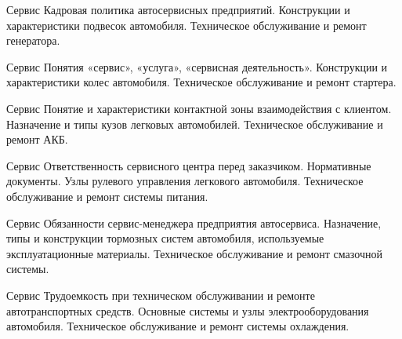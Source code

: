 \documentclass[
	11pt,
	a4paper,
	]
	{article}
\begin{document}
\begin{minipage}[t][\miniH]{\miniL}\centering
	 {Сервис}
		{
			Кадровая политика автосервисных предприятий.
		}{
			Конструкции и характеристики подвесок автомобиля.
		}{
			Техническое обслуживание и ремонт генератора.
		}
	\lowGE
\end{minipage}

\vfill



\begin{minipage}[t][\miniH]{\miniL}\centering
	 {Сервис}
		{
			Понятия «сервис», «услуга», «сервисная деятельность».
		}{
			Конструкции и характеристики колес автомобиля.
		}{
			Техническое обслуживание и ремонт стартера.
		}
	\lowGE
\end{minipage}





\begin{minipage}[t][\miniH]{\miniL}\centering
	 {Сервис}
		{
			Понятие и характеристики контактной зоны взаимодействия с клиентом.
		}{
			Назначение и типы кузов легковых автомобилей.
		}{
			Техническое обслуживание и ремонт АКБ.
		}
	\lowGE
\end{minipage}

\vfill



\begin{minipage}[t][\miniH]{\miniL}\centering
	 {Сервис}
		{
			Ответственность сервисного центра перед заказчиком. Нормативные документы.
		}{
			Узлы рулевого управления легкового автомобиля.
		}{
			Техническое обслуживание и ремонт системы питания.
		}
	\lowGE
\end{minipage}

\vfill



\begin{minipage}[t][\miniH]{\miniL}\centering
	 {Сервис}
		{
			Обязанности сервис-менеджера предприятия автосервиса.
		}{
			Назначение, типы и конструкции тормозных систем автомобиля, используемые эксплуатационные материалы.
		}{
			Техническое обслуживание и ремонт смазочной системы.
		}
	\lowGE
\end{minipage}





\begin{minipage}[t][\miniH]{\miniL}\centering
	 {Сервис}
		{
			Трудоемкость при техническом обслуживании и ремонте автотранспортных средств.
		}{
			Основные системы и узлы электрооборудования автомобиля.
		}{
			Техническое обслуживание и ремонт системы охлаждения.
		}
	\lowGE
\end{minipage}
\end{document}
